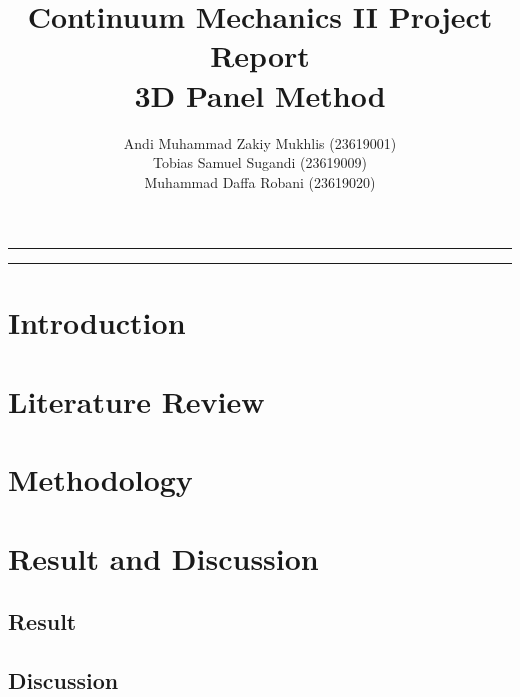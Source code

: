 \documentclass{article}
\begin{document}
\title{Continuum Mechanics II Project Report\\ 3D Panel Method \\}
\author{\small Andi Muhammad Zakiy Mukhlis (23619001) \\ Tobias Samuel Sugandi (23619009) \\ Muhammad Daffa Robani (23619020)}
\date{}
\affil{}
\maketitle

\hrule
\begin{abstract}

\end{abstract}
\hrule

\section{Introduction}

\section{Literature Review}

\section{Methodology}


\section{Result and Discussion}
\subsection{Result}

\subsection{Discussion}
\end{document}

